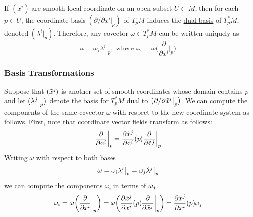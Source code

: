 \documentclass{article}
\begin{document}
    If $(x^i)$ are smooth local coordinate on an open subset $U \subset M$, then for each $p \in U$, the coordinate basis $(\partial/\partial x^i |_p )$ of $T_p M$ induces the \hyperref[lin-def:dual-basis]{dual basis} of $T_p^* M$, denoted $(\lambda^i |_p)$. Therefore, any covector $\omega \in T_p^* M$ can be written uniquely as 
    \begin{equation}
      \omega = \omega_i \lambda^i \big|_p, \text{ where } \omega_i = \omega \bigg( \frac{\partial}{\partial x^i} \bigg|_p \bigg)
    \end{equation}

    \subsubsection{Basis Transformations}

      Suppose that $(\Tilde{x}^j)$ is another set of smooth coordinates whose domain contains $p$ and let $\big( \Tilde{\lambda}^j \big|_p\big)$ denote the basis for $T_p^* M$ dual to $\big(\partial /\partial \Tilde{x}^j \big|_p \big)$. We can compute the components of the same covector $\omega$ with respect to the new coordinate system as follows. First, note that coordinate vector fields transform as follows: 
      \begin{equation}
        \frac{\partial}{\partial x^i} \bigg|_p = \frac{\partial \Tilde{x}^j}{\partial x^i} (p) \frac{\partial}{\partial \Tilde{x}^j} \bigg|_p
      \end{equation}
      Writing $\omega$ with respect to both bases 
      \begin{equation}
        \omega = \omega_i \lambda^i \big|_p = \Tilde{\omega}_j \Tilde{\lambda}^j \big|_p
      \end{equation}
      we can compute the components $\omega_i$ in terms of $\Tilde{\omega}_j$. 
      \begin{equation}
        \omega_i = \omega \bigg( \frac{\partial}{\partial x^i} \bigg|_p \bigg) = \omega \bigg( \frac{\partial \Tilde{x}^j}{\partial x^i} (p) \frac{\partial}{\partial \Tilde{x}^j} \bigg|_p \bigg) = \frac{\partial \Tilde{x}^j}{\partial x^i} (p) \Tilde{\omega}_j
      \end{equation}
\end{document}
